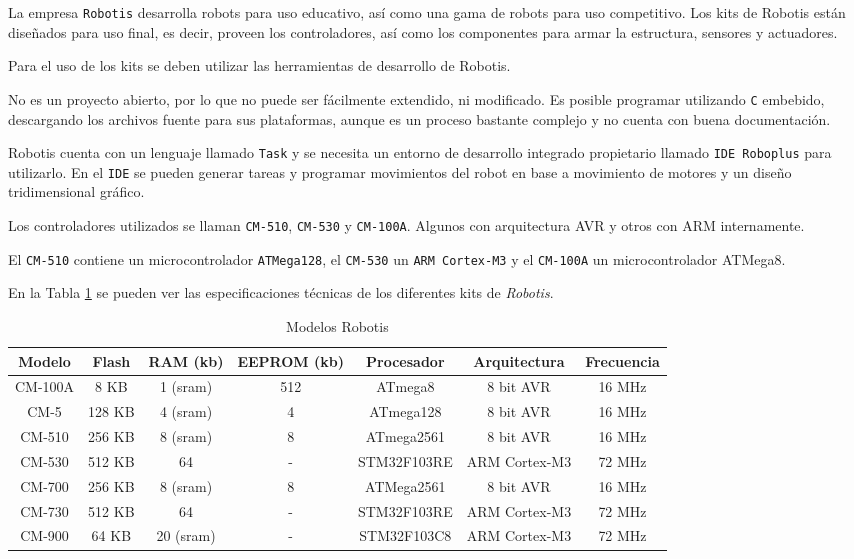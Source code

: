
  La empresa \texttt{Robotis} desarrolla robots para uso
educativo, así como una gama de robots para uso competitivo.
  Los kits de Robotis están diseñados para uso final, es decir,
proveen los controladores, así como los componentes para armar
la estructura, sensores y actuadores.

  Para el uso de los kits se deben utilizar las herramientas de desarrollo
de Robotis.

  No es un proyecto abierto, por lo que no puede ser fácilmente
extendido, ni modificado.
  Es posible programar utilizando \texttt{C} embebido, descargando
los archivos fuente para sus plataformas, aunque es un proceso
bastante complejo y no cuenta con buena documentación.

  Robotis cuenta con un lenguaje llamado \texttt{Task} y se necesita
un entorno de desarrollo integrado propietario llamado 
\texttt{IDE Roboplus} para utilizarlo.
  En el \texttt{IDE} se pueden generar tareas y programar
movimientos del robot en base a movimiento de motores y un
diseño tridimensional gráfico.

  Los controladores utilizados se llaman \texttt{CM-510},
\texttt{CM-530} y \texttt{CM-100A}. Algunos con
arquitectura AVR y otros con ARM internamente.

  El \texttt{CM-510} contiene un microcontrolador \texttt{ATMega128},
el \texttt{CM-530} un \texttt{ARM Cortex-M3} y el
\texttt{CM-100A} un microcontrolador {ATMega8}.

  En la Tabla \ref{table-robotis} se pueden ver las especificaciones
  técnicas de los diferentes kits de \textit{Robotis}.

\begin{table}[htbp]
    \centering
    \scriptsize
    \caption{Modelos Robotis}
    \label{table-robotis}
  \begin{tabular}{|c|c|c|c|c|c|c|}
    \hline
      Modelo & Flash & RAM (kb) & EEPROM (kb) & Procesador & Arquitectura & Frecuencia \\
    \hline
      CM-100A & 8 KB & 1 (sram) & 512 & ATmega8 & 8 bit AVR & 16 MHz \\
    \hline
      CM-5 & 128 KB & 4 (sram) & 4 & ATmega128 & 8 bit AVR & 16 MHz \\
    \hline
      CM-510 & 256 KB & 8 (sram) & 8 & ATmega2561 & 8 bit AVR & 16 MHz \\
    \hline
      CM-530 & 512 KB & 64 & - & STM32F103RE & ARM Cortex-M3 & 72 MHz \\
    \hline
      CM-700 & 256 KB & 8 (sram) & 8 & ATMega2561 & 8 bit AVR & 16 MHz \\
    \hline
      CM-730 & 512 KB & 64 & - & STM32F103RE & ARM Cortex-M3 & 72 MHz \\
    \hline
      CM-900 & 64 KB & 20 (sram) & - & STM32F103C8 & ARM Cortex-M3 & 72 MHz \\
    \hline
    \end{tabular}
  \end{table}

